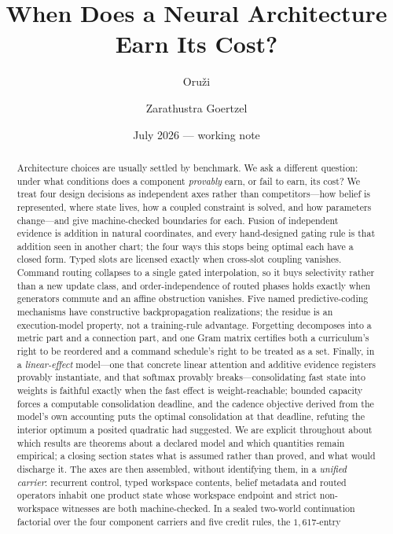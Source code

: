 \documentclass[11pt]{article}
\title{When Does a Neural Architecture\\ Earn Its Cost?}
\author{Oru\v{z}i \and Zarathustra Goertzel}
\date{July 2026 --- working note}
\begin{document}
\maketitle

\begin{abstract}
\noindent
Architecture choices are usually settled by benchmark. We ask a different question:
under what conditions does a component \emph{provably} earn, or fail to earn, its cost?
We treat four design decisions as independent axes rather than competitors---how belief
is represented, where state lives, how a coupled constraint is solved, and how parameters
change---and give machine-checked boundaries for each. Fusion of independent evidence is
addition in natural coordinates, and every hand-designed gating rule is that addition seen
in another chart; the four ways this stops being optimal each have a closed form. Typed
slots are licensed exactly when cross-slot coupling vanishes. Command routing collapses to
a single gated interpolation, so it buys selectivity rather than a new update class, and
order-independence of routed phases holds exactly when generators commute and an affine
obstruction vanishes. Five named predictive-coding mechanisms have constructive
backpropagation realizations; the residue is an execution-model property, not a
training-rule advantage. Forgetting decomposes into a metric part and a connection part,
and one Gram matrix certifies both a curriculum's right to be reordered and a command
schedule's right to be treated as a set. Finally, in a \emph{linear-effect} model---one that
concrete linear attention and additive evidence registers provably instantiate, and that
softmax provably breaks---consolidating fast state into weights is faithful exactly when
the fast effect is weight-reachable; bounded capacity forces a computable consolidation
deadline, and the cadence objective derived from the model's own accounting puts the
optimal consolidation at that deadline, refuting the interior optimum a posited quadratic
had suggested. We are
explicit throughout about which results are theorems about a declared model and which
quantities remain empirical; a closing section states what is assumed rather than proved,
and what would discharge it. The axes are then assembled, without identifying them, in a
\emph{unified carrier}: recurrent control, typed workspace contents, belief metadata and
routed operators inhabit one product state whose workspace endpoint and strict
non-workspace witnesses are both machine-checked. In a sealed two-world continuation
factorial over the four component carriers and five credit rules, the $1{,}617$-entry

\end{abstract}
\end{document}
